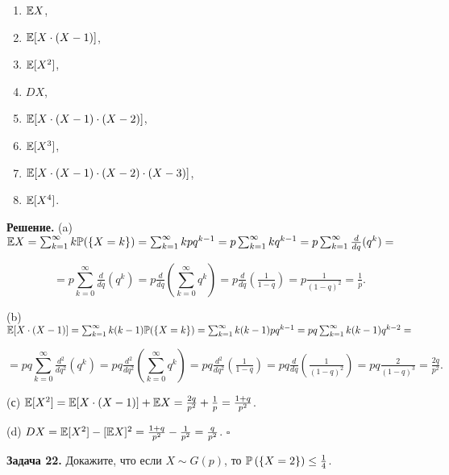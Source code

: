 \begin{enumerate}
\item  ${\rm {\mathbb E}}X$,

\item  ${\rm {\mathbb E}}[X\cdot (X-1)]$,

\item  ${\rm {\mathbb E}}[X^{2} ]$,

\item  $DX$,

\item  ${\rm {\mathbb E}}[X\cdot (X-1)\cdot (X-2)]$,

\item  ${\rm {\mathbb E}}[X^{3} ]$,

\item  ${\rm {\mathbb E}}[X\cdot (X-1)\cdot (X-2)\cdot (X-3)]$,

\item  ${\rm {\mathbb E}}[X^{4} ]$.
\end{enumerate}

\textbf{Решение.} (a) ${\rm {\mathbb E}}X=\sum _{k=1}^{\infty }k{\rm {\mathbb P}}(\{ X=k\} ) =\sum _{k=1}^{\infty }kpq^{k-1}  =p\sum _{k=1}^{\infty }kq^{k-1}  =p\sum _{k=1}^{\infty }{\tfrac{d}{dq}} (q^{k} ) =$

\[=p\sum _{k=0}^{\infty }{\tfrac{d}{dq}} (q^{k} ) =p{\tfrac{d}{dq}} \left(\sum _{k=0}^{\infty }q^{k}  \right)=p{\tfrac{d}{dq}} \left({\tfrac{1}{1-q}} \right)=p{\tfrac{1}{(1-q)^{2} }} ={\tfrac{1}{p}} .\] 

(b) ${\rm {\mathbb E}}[X\cdot (X-1)]=\sum _{k=1}^{\infty }k(k-1){\rm {\mathbb P}}(\{ X=k\} ) =\sum _{k=1}^{\infty }k(k-1)pq^{k-1}  =pq\sum _{k=1}^{\infty }k(k-1)q^{k-2}  =$

\[=pq\sum _{k=0}^{\infty }{\tfrac{d^{2} }{dq^{2} }} (q^{k} ) =pq{\tfrac{d^{2} }{dq^{2} }} \left(\sum _{k=0}^{\infty }q^{k}  \right)=pq{\tfrac{d^{2} }{dq^{2} }} \left({\tfrac{1}{1-q}} \right)=pq{\tfrac{d}{dq}} \left({\tfrac{1}{(1-q)^{2} }} \right)=pq{\tfrac{2}{(1-q)^{3} }} ={\tfrac{2q}{p^{2} }} .\] 

(с) ${\rm {\mathbb E}}[X^{2} ]={\rm {\mathbb E}}[X\cdot (X-1)]+{\rm {\mathbb E}}X={\tfrac{2q}{p^{2} }} +{\tfrac{1}{p}} ={\tfrac{1+q}{p^{2} }} $.

(d) $DX={\rm {\mathbb E}}[X^{2} ]-[{\rm {\mathbb E}}X]^{2} ={\tfrac{1+q}{p^{2} }} -{\tfrac{1}{p^{2} }} ={\tfrac{q}{p^{2} }} $. $\square $

\textbf{Задача 22.} Докажите, что если $X\sim G(p)$, то ${\rm {\mathbb P}}\left(\left\{X=2\right\}\right)\le {\tfrac{1}{4}} $.

